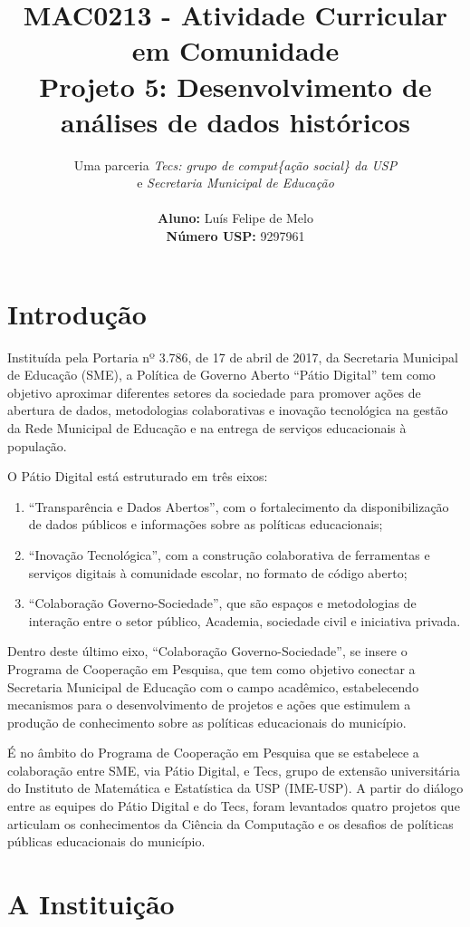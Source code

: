 \documentclass{article}
\title{\textbf{MAC0213 - Atividade Curricular em Comunidade \\ Projeto 5: Desenvolvimento de análises de dados históricos}}
\author{
	Uma parceria \textit{Tecs: grupo de comput\{ação social\} da USP} \\ e \textit{Secretaria Municipal de Educação} \\
    \\
    \textbf{Aluno:} Luís Felipe de Melo  \\
    \textbf{Número USP:} 9297961
    }
\date{}
\begin{document}
\maketitle

\section{Introdução}

Instituída pela Portaria nº 3.786, de 17 de abril de 2017, da Secretaria Municipal de Educação (SME), a Política de Governo Aberto “Pátio Digital” tem como objetivo aproximar diferentes setores da sociedade para promover ações de abertura de dados, metodologias colaborativas e inovação tecnológica na gestão da Rede Municipal de Educação e na entrega de serviços educacionais à população.

O Pátio Digital está estruturado em três eixos: 

\begin{enumerate}
\item “Transparência e Dados Abertos”, com o fortalecimento da disponibilização de dados públicos e informações sobre as políticas educacionais;
\item “Inovação Tecnológica”, com a construção colaborativa de ferramentas e serviços digitais à comunidade escolar, no formato de código aberto;
\item “Colaboração Governo-Sociedade”, que são espaços e metodologias de interação entre o setor público, Academia, sociedade civil e iniciativa privada.
\end{enumerate}

Dentro deste último eixo, “Colaboração Governo-Sociedade”, se insere o Programa de Cooperação em Pesquisa, que tem como objetivo conectar a Secretaria Municipal de Educação com o campo acadêmico, estabelecendo mecanismos para o desenvolvimento de projetos e ações que estimulem a produção de conhecimento sobre as políticas educacionais do município. 

É no âmbito do Programa de Cooperação em Pesquisa que se estabelece a colaboração entre SME, via Pátio Digital, e Tecs, grupo de extensão universitária do Instituto de Matemática e Estatística da USP (IME-USP). A partir do diálogo entre as equipes do Pátio Digital e do Tecs, foram levantados quatro projetos que articulam os conhecimentos da Ciência da Computação e os desafios de políticas públicas educacionais do município. 

\section{A Instituição}
\end{document}

